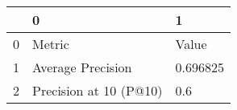 \begin{tabular}{lll}
\toprule
{} &                       0 &         1 \\
\midrule
0 &                  Metric &     Value \\
1 &       Average Precision &  0.696825 \\
2 &  Precision at 10 (P@10) &       0.6 \\
\bottomrule
\end{tabular}
